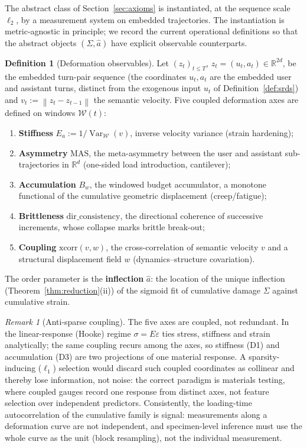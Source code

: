 \documentclass[11pt]{article}
\theoremstyle{plain}
\theoremstyle{definition}
\newtheorem{definition}[theorem]{Definition}
\theoremstyle{remark}
\newtheorem{remark}[theorem]{Remark}
\DeclareMathOperator{\Var}{Var}
\newcommand{\R}{\mathbb{R}}
\newcommand{\norm}[1]{\left\lVert#1\right\rVert}
\begin{document}
The abstract class of Section~\ref{sec:axioms} is instantiated, at the sequence scale $\ell_2$, by a measurement system on embedded trajectories. The instantiation is metric-agnostic in principle; we record the current operational definitions so that the abstract objects $(\Sigma,\hat a)$ have explicit observable counterparts.

\begin{definition}[Deformation observables]\label{def:axes}
Let $(z_t)_{t\le T}$, $z_t=(u_t,a_t)\in\R^{2d}$, be the embedded turn-pair sequence (the coordinates $u_t,a_t$ are the embedded user and assistant turns, distinct from the exogenous input $u_t$ of Definition~\ref{def:srds}) and $v_t:=\norm{z_t-z_{t-1}}$ the semantic velocity. Five coupled deformation axes are defined on windows $\mathcal W(t)$:
\begin{enumerate}[label=\textnormal{(D\arabic*)},leftmargin=3em]
\item \textbf{Stiffness} $E_a:=1/\Var_{\mathcal W}(v)$, inverse velocity variance (strain hardening);
\item \textbf{Asymmetry} $\mathrm{MAS}$, the meta-asymmetry between the user and assistant sub-trajectories in $\R^{d}$ (one-sided load introduction, cantilever);
\item \textbf{Accumulation} $B_w$, the windowed budget accumulator, a monotone functional of the cumulative geometric displacement (creep/fatigue);
\item \textbf{Brittleness} $\mathrm{dir\_consistency}$, the directional coherence of successive increments, whose collapse marks brittle break-out;
\item \textbf{Coupling} $\mathrm{xcorr}(v,w)$, the cross-correlation of semantic velocity $v$ and a structural displacement field $w$ (dynamics--structure covariation).
\end{enumerate}
The order parameter is the \textbf{inflection} $\hat a$: the location of the unique inflection (Theorem~\ref{thm:reduction}(ii)) of the sigmoid fit of cumulative damage $\Sigma$ against cumulative strain.
\end{definition}

\begin{remark}[Anti-sparse coupling]\label{rem:antisparse}
The five axes are coupled, not redundant. In the linear-response (Hooke) regime $\sigma=E\varepsilon$ ties stress, stiffness and strain analytically; the same coupling recurs among the axes, so stiffness (D1) and accumulation (D3) are two projections of one material response. A sparsity-inducing ($\ell_1$) selection would discard such coupled coordinates as collinear and thereby lose information, not noise: the correct paradigm is materials testing, where coupled gauges record one response from distinct axes, not feature selection over independent predictors. Consistently, the loading-time autocorrelation of the cumulative family is signal: measurements along a deformation curve are not independent, and specimen-level inference must use the whole curve as the unit (block resampling), not the individual measurement.
\end{remark}
\end{document}
